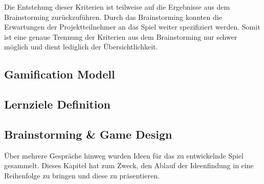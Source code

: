 	Die Entstehung dieser Kriterien ist teilweise auf die Ergebnisse aus dem Brainstorming zurückzuführen. Durch das Brainstorming konnten die Erwartungen der Projektteilnehmer an das Spiel weiter spezifiziert werden. Somit ist eine genaue Trennung der Kriterien aus dem Brainstorming nur schwer möglich und dient lediglich der Übersichtlichkeit.

\subsection{Gamification Modell}
\subsection{Lernziele Definition}

\subsection{Brainstorming \& Game Design}\label{ssec:idee}
	Über mehrere Gespräche hinweg wurden Ideen für das zu entwickelnde Spiel gesammelt. Dieses Kapitel hat zum Zweck, den Ablauf der Ideenfindung in eine Reihenfolge zu bringen und diese zu präsentieren.
